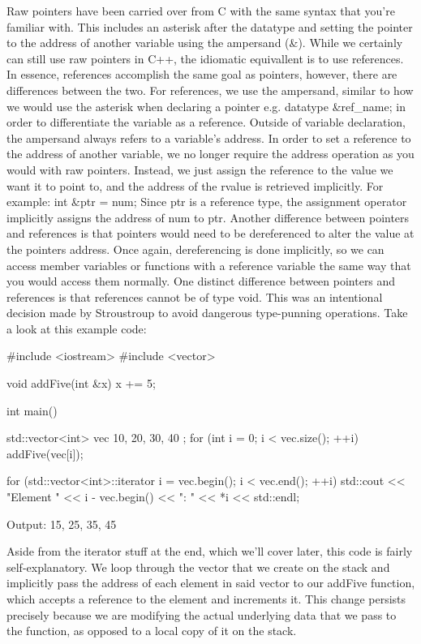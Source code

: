 \documentclass{article}
\begin{document}
Raw pointers have been carried over from C with the same syntax that you're familiar with. This includes an
asterisk after the datatype and setting the pointer to the address of another variable using the ampersand (\&).
While we certainly can still use raw pointers in C++, the idiomatic equivallent is to use references. In
essence, references accomplish the same goal as pointers, however, there are differences between the two. For
references, we use the ampersand, similar to how we would use the asterisk when declaring a pointer e.g.
datatype \&ref\_name; in order to differentiate the variable as a reference. Outside of variable declaration,
the ampersand always refers to a variable's address. In order to set a reference to the address of another
variable, we no longer require the address operation as you would with raw pointers. Instead, we just assign
the reference to the value we want it to point to, and the address of the rvalue is retrieved implicitly. For
example: int \&ptr = num; Since ptr is a reference type, the assignment operator implicitly assigns the address
of num to ptr. Another difference between pointers and references is that pointers would need to be
dereferenced to alter the value at the pointers address. Once again, dereferencing is done implicitly, so we
can access member variables or functions with a reference variable the same way that you would access them
normally. One distinct difference between pointers and references is that references cannot be of type void.
This was an intentional decision made by Stroustroup to avoid dangerous type-punning operations. Take a look
at this example code:

\begin{cpplst}
#include <iostream>
#include <vector>

void addFive(int &x)
{
    x += 5;
}

int main()
{
    std::vector<int> vec { 10, 20, 30, 40 };
    for (int i = 0; i < vec.size(); ++i)
    {
        addFive(vec[i]);
    }

    for (std::vector<int>::iterator i = vec.begin(); i < vec.end(); ++i)
    {
        std::cout << "Element " << i - vec.begin() << ": " << *i << std::endl;
    }
}
\end{cpplst}

Output: 15, 25, 35, 45

Aside from the iterator stuff at the end, which we'll cover later, this code is fairly self-explanatory. We loop
through the vector that we create on the stack and implicitly pass the address of each element in said vector
to our addFive function, which accepts a reference to the element and increments it. This change persists
precisely because we are modifying the actual underlying data that we pass to the function, as opposed to a
local copy of it on the stack.
\end{document}

